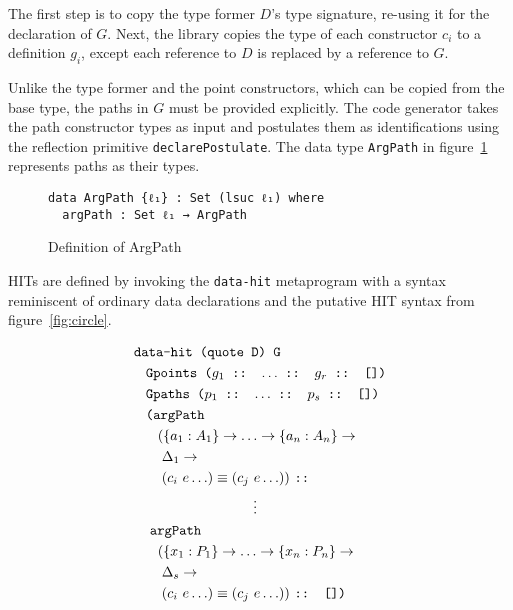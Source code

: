 \documentclass[sigplan,10pt]{acmart}
\begin{document}
The first step is to copy the type former $D$'s type signature, re-using it for the declaration of $G$.
Next, the library copies the type of each constructor $c_i$ to a definition $g_i$, except each reference to $D$ is replaced by a reference to $G$.

Unlike the type former and the point constructors, which can be copied from the base type, the paths in $G$ must be provided explicitly.
The code generator takes the path constructor types as input and postulates them as identifications using the reflection primitive {\tt declarePostulate}.
The data type {\tt ArgPath} in figure~\ref{fig:argPath} represents paths as their types.

\begin{figure}
\begin{center}
\begingroup
\begin{BVerbatim}
data ArgPath {ℓ₁} : Set (lsuc ℓ₁) where
  argPath : Set ℓ₁ → ArgPath
\end{BVerbatim}
\endgroup
\end{center}
\caption{Definition of ArgPath}
\label{fig:argPath}
\end{figure}

HITs are defined by invoking the \texttt{data-hit} metaprogram with a syntax reminiscent of ordinary data declarations and the putative HIT syntax from figure~\ref{fig:circle}.

\begin{align*}
& \texttt{data-hit (quote D) G}\\
  & \hspace {0.3cm} \texttt{Gpoints ($g_1$ :: $\ldots$ :: $g_r$ :: [])} \\
  & \hspace {0.3cm} \texttt{Gpaths ($p_1$ :: $\ldots$ :: $p_s$ :: [])} \\
  & \hspace {0.3cm} \texttt{(argPath} \\
  & \hspace {0.6cm} (\{a_1:A_1\} \rightarrow \ldots \rightarrow \{a_n:A_n\} \rightarrow \\
  & \hspace {0.7cm} \Delta_1 \rightarrow \\
  & \hspace {0.7cm} (c_i\ e \ldots) \equiv (c_j\ e \ldots))\ \texttt{::} \\
  & \hspace {3cm} \vdots \\
  & \hspace {0.4cm} \texttt{argPath} \\
  & \hspace {0.6cm} (\{x_1:P_1\} \rightarrow \ldots \rightarrow \{x_n:P_n\} \rightarrow \\
  & \hspace {0.7cm} \Delta_s \rightarrow \\
  & \hspace {0.7cm} (c_i\ e \ldots) \equiv (c_j\ e \ldots))\ \texttt{:: [])}\\ \nonumber
\end{align*}
\end{document}
